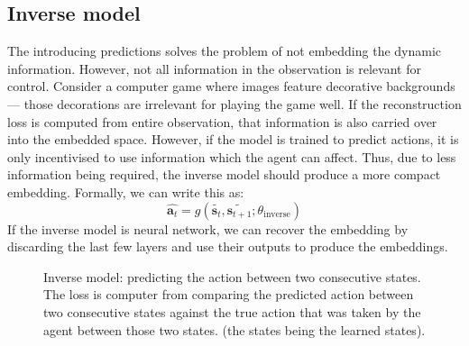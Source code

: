 \subsection{Inverse model}
The introducing predictions solves the problem of not embedding the dynamic
information.
However, not all information in the observation is relevant for control.
Consider a computer game where images feature decorative backgrounds ---
those decorations are irrelevant for playing the game well.
If the reconstruction loss is computed from entire observation,
that information is also carried over into the embedded space.
However, if the model is trained to predict actions,
it is only incentivised to use information which the agent can affect.
Thus, due to less information being required,
the inverse model should produce a more compact embedding.
Formally, we can write this as:
\begin{equation}
		\hat{\bm{a}_{t}} = g (\tilde{\bm{s}_{t}}, \tilde{\bm{s}_{t+1}}; \theta_{ \text{inverse} })
\end{equation}
If the inverse model is neural network, we can recover the embedding by discarding
the last few layers and use their outputs to produce the embeddings.

\begin{figure}[htpb]
\begin{center}
\end{center}
		\caption{Inverse model: predicting the action between two consecutive states.
				The loss is computer from comparing the predicted action between two consecutive states
				against the true action that
				was taken by the agent between those two states.
				(the states being the learned states).
				}
\end{figure}

